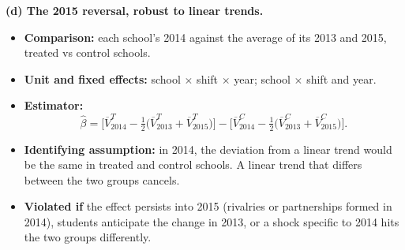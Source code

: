 \documentclass[11pt]{article}
\begin{document}
\medskip
\noindent\textbf{(d) The 2015 reversal, robust to linear trends.}
\begin{itemize}
  \item \textbf{Comparison:} each school's 2014 against the average of its 2013
        and 2015, treated vs control schools.
  \item \textbf{Unit and fixed effects:} school $\times$ shift $\times$ year;
        school $\times$ shift and year.
  \item \textbf{Estimator:}
        \begin{equation}
          \hat\beta = \Big[\overline{V}^{T}_{2014}
          - \tfrac{1}{2}\big(\overline{V}^{T}_{2013} + \overline{V}^{T}_{2015}\big)\Big]
          - \Big[\overline{V}^{C}_{2014}
          - \tfrac{1}{2}\big(\overline{V}^{C}_{2013} + \overline{V}^{C}_{2015}\big)\Big].
        \end{equation}
  \item \textbf{Identifying assumption:} in 2014, the deviation from a linear
        trend would be the same in treated and control schools. A linear trend
        that differs between the two groups cancels.
  \item \textbf{Violated if} the effect persists into 2015 (rivalries or
        partnerships formed in 2014), students anticipate the change in 2013,
        or a shock specific to 2014 hits the two groups differently.
\end{itemize}
\end{document}
